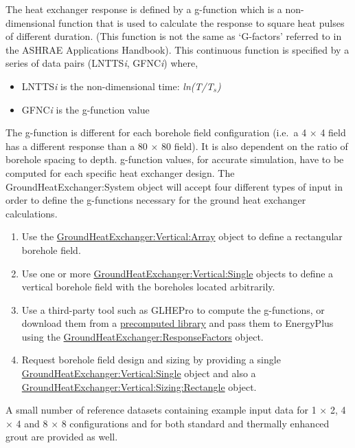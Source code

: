 The heat exchanger response is defined by a g-function which is a non-dimensional function that is used to calculate the response to square heat pulses of different duration. (This function is not the same as `G-factors' referred to in the ASHRAE Applications Handbook). This continuous function is specified by a series of data pairs (LNTTS\emph{i}, GFNC\emph{i}) where,

\begin{itemize}
\item
  LNTTS\emph{i} is the non-dimensional time: \emph{ln(T/T\(_{s}\))}
\item
  GFNC\emph{i} is the g-function value
\end{itemize}

The g-function is different for each borehole field configuration (i.e.~a 4 $\times$ 4 field has a different response than a 80 $\times$ 80 field). It is also dependent on the ratio of borehole spacing to depth. g-function values, for accurate simulation, have to be computed for each specific heat exchanger design. The GroundHeatExchanger:System object will accept four different types of input in order to define the g-functions necessary for the ground heat exchanger calculations.

\begin{enumerate}
    \item Use the \hyperref[groundheatexchangerverticalarray]{GroundHeatExchanger:Vertical:Array} object to define a rectangular borehole field.
    \item Use one or more \hyperref[groundheatexchangerverticalsingle]{GroundHeatExchanger:Vertical:Single} objects to define a vertical borehole field with the boreholes located arbitrarily.
    \item Use a third-party tool such as GLHEPro to compute the g-functions, or download them from a \href{https://gdr.openei.org/submissions/1325}{precomputed library} and pass them to EnergyPlus using the \hyperref[groundheatexchangerresponsefactors]{GroundHeatExchanger:ResponseFactors} object.
    \item Request borehole field design and sizing by providing a single \hyperref[groundheatexchangerverticalsingle]{GroundHeatExchanger:Vertical:Single} object and also a \hyperref[groundheatexchangerverticalsizingrect]{GroundHeatExchanger:Vertical:Sizing:Rectangle} object.
\end{enumerate}

A small number of reference datasets containing example input data for 1 $\times$ 2, 4 $\times$ 4 and 8 $\times$ 8 configurations and for both standard and thermally enhanced grout are provided as well.

